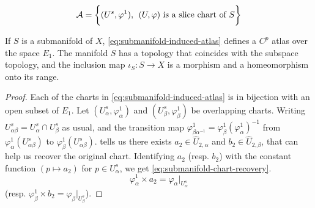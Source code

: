 \documentclass[../main-manifolds.tex]{subfiles}
\begin{document}
\begin{equation}\label{eq:submanifold-induced-atlas}
    \mathcal{A} = \biggl\{{(U^s, \varphi^1),\:\: (U,\varphi)\text{ is a slice chart of }S}\biggr\}
\end{equation}
\begin{wts}\label{prop:structure-of-submanifold}
    If $S$ is a submanifold of $X$, \cref{eq:submanifold-induced-atlas} defines a $C^p$ atlas over the space $E_1$. The manifold $S$ has a topology that coincides with the subspace topology, and the inclusion map $\iota_S: S\to X$ is a morphism and a homeomorphism onto its range.
\end{wts}
\begin{proof}
    Each of the charts in \cref{eq:submanifold-induced-atlas} is in bijection with an open subset of $E_1$. Let $(U^s_{\alpha}, \varphi^1_\alpha)$ and $(U^s_{\beta}, \varphi^1_\beta)$ be overlapping charts. Writing $U^s_{\alpha\beta} = U^s_{\alpha}\cap U^s_{\beta}$ as usual, and the transition map $\varphi^1_{\beta\alpha^{-1}} = \varphi^1_{\beta}(\varphi^1_{\alpha})^{-1}$ from $\varphi_{\alpha}^1(U_{\alpha\beta}^s)$ to $\varphi_{\beta}^1(U_{\alpha\beta}^s)$.  tells us there exists $a_2\in \hat{U}_{2,\alpha}$ and $b_2\in \hat{U}_{2,\beta}$, that can help us recover the original chart. Identifying $a_2$ (resp. $b_2$) with the constant function $(p\mapsto a_2)$ for $p\in U_{\alpha}^s$, we get \cref{eq:submanifold-chart-recovery}.
    \begin{equation}\label{eq:submanifold-chart-recovery}
    \varphi^1_{\alpha}\times a_2 = \varphi_{\alpha}\vert_{U^s_{\alpha}}
    \end{equation}
    (resp. $\varphi^1_{\beta}\times b_2 = \varphi_{\beta}\vert_{U^s_{\beta}}$). 
\end{proof}
\end{document}
